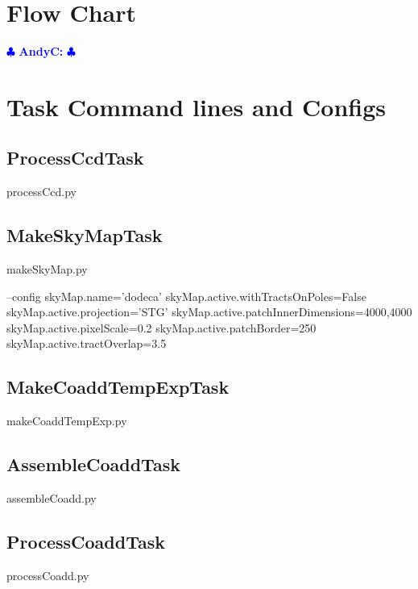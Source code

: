 \documentclass[12pt]{article}
\newcommand{\ajc} { \textcolor{blue} {
\ensuremath{\clubsuit} {\bf AndyC:}  
\ensuremath{\clubsuit} } }
\begin{document}
\clearpage 
\begin{appendices}

\section{Flow Chart} \ajc

\section{Task Command lines and Configs}

\subsection{ProcessCcdTask}
\begin{python}
processCcd.py
\end{python}


\subsection{MakeSkyMapTask}
\begin{python}
makeSkyMap.py

--config
skyMap.name='dodeca'
skyMap.active.withTractsOnPoles=False
skyMap.active.projection='STG'
skyMap.active.patchInnerDimensions=4000,4000
skyMap.active.pixelScale=0.2
skyMap.active.patchBorder=250
skyMap.active.tractOverlap=3.5
\end{python}

\subsection{MakeCoaddTempExpTask} 
\begin{python}
makeCoaddTempExp.py
\end{python}

\subsection{AssembleCoaddTask} 
\begin{python}
assembleCoadd.py
\end{python}

\subsection{ProcessCoaddTask} 
\begin{python}
processCoadd.py
\end{python}


\end{appendices}
\end{document}
